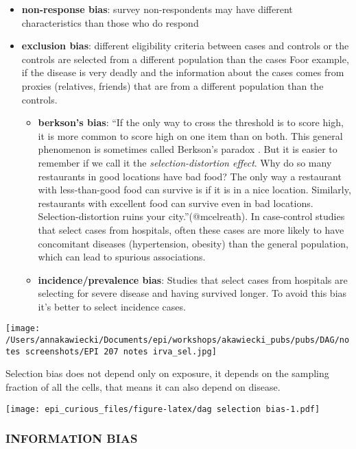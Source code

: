 \documentclass[
]{article}
\begin{document}
\begin{itemize}
\item
  \textbf{non-response bias}: survey non-respondents may have different
  characteristics than those who do respond
\item
  \textbf{exclusion bias}: different eligibility criteria between cases
  and controls or the controls are selected from a different population
  than the cases Foor example, if the disease is very deadly and the
  information about the cases comes from proxies (relatives, friends)
  that are from a different population than the controls.

  \begin{itemize}
  \item
    \textbf{berkson's bias}: ``If the only way to cross the threshold is
    to score high, it is more common to score high on one item than on
    both. This general phenomenon is sometimes called Berkson's paradox
    . But it is easier to remember if we call it the
    \emph{selection-distortion effect}. Why do so many restaurants in
    good locations have bad food? The only way a restaurant with
    less-than-good food can survive is if it is in a nice location.
    Similarly, restaurants with excellent food can survive even in bad
    locations. Selection-distortion ruins your city.''(@mcelreath). In
    case-control studies that select cases from hospitals, often these
    cases are more likely to have concomitant diseases (hypertension,
    obesity) than the general population, which can lead to spurious
    associations.
  \item
    \textbf{incidence/prevalence bias}: Studies that select cases from
    hospitals are selecting for severe disease and having survived
    longer. To avoid this bias it's better to select incidence cases.
  \end{itemize}
\end{itemize}

\texttt{[image: /Users/annakawiecki/Documents/epi/workshops/akawiecki\_pubs/pubs/DAG/notes screenshots/EPI 207 notes irva\_sel.jpg]}

Selection bias does not depend only on exposure, it depends on the
sampling fraction of all the cells, that means it can also depend on
disease.

\texttt{[image: epi\_curious\_files/figure-latex/dag selection bias-1.pdf]}

\hypertarget{information-bias}{%
\subsubsection{INFORMATION BIAS}\label{information-bias}}
\end{document}
